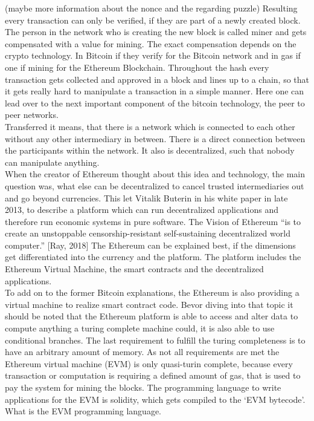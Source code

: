  (maybe more information about the nonce and the regarding puzzle) Resulting every transaction can only be verified, if they are part of a newly created block. The person in the network who is creating the new block is called miner and gets compensated with a value for mining. The exact compensation depends on the crypto technology. In Bitcoin if they verify for the Bitcoin network and in gas if one if mining for the Ethereum Blockchain. Throughout the hash every transaction gets collected and approved in a block and lines up to a chain, so that it gets really hard to manipulate a transaction in a simple manner. Here one can lead over to the next important component of the bitcoin technology, the peer to peer networks. 
\\
Transferred it means, that there is a network which is connected to each other without any other intermediary in between. There is a direct connection between the participants within the network. It also is decentralized, such that nobody can manipulate anything.
\\
When the creator of Ethereum thought about this idea and technology, the main question was, what else can be decentralized to cancel trusted intermediaries out and go beyond currencies. This let Vitalik Buterin in his white paper in late 2013, to describe a platform which can run decentralized applications and therefore run economic systems in pure software. The Vision of Ethereum “is to create an unstoppable censorship-resistant self-sustaining decentralized world computer.” [Ray, 2018]
The Ethereum can be explained best, if the dimensions get differentiated into the currency and the platform. The platform includes the Ethereum Virtual Machine, the smart contracts and the decentralized applications. 
\\
To add on to the former Bitcoin explanations, the Ethereum is also providing a virtual machine to realize smart contract code. Bevor diving into that topic it should be noted that the Ethereum platform is able to access and alter data to compute anything a turing complete machine could, it is also able to use conditional branches. The last requirement to fulfill the turing completeness is to have an arbitrary amount of memory. As not all requirements are met the Ethereum virtual machine (EVM) is only quasi-turin complete, because every transaction or computation is requiring a defined amount of gas, that is used to pay the system for mining the blocks. The programming language to write applications for the EVM is solidity, which gets compiled to the ‘EVM bytecode’. What is the EVM programming language. 

